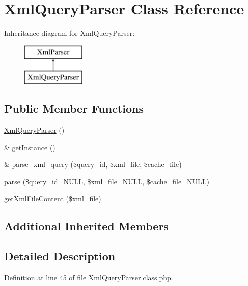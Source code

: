 \hypertarget{classXmlQueryParser}{\section{Xml\+Query\+Parser Class Reference}
\label{classXmlQueryParser}
}
Inheritance diagram for Xml\+Query\+Parser\+:\begin{figure}[H]
\begin{center}
\leavevmode
\includegraphics[height=2.000000cm]{classXmlQueryParser}
\end{center}
\end{figure}
\subsection*{Public Member Functions}
\begin{DoxyCompactItemize}
\item 
\hyperlink{classXmlQueryParser_ac90d36a02cc74ea88d162d6fa0a44e21}{Xml\+Query\+Parser} ()
\item 
\& \hyperlink{classXmlQueryParser_af6558a14a48242f4082d4b05e24b66be}{get\+Instance} ()
\item 
\& \hyperlink{classXmlQueryParser_ada0b24aac541d493f8344a74776664cb}{parse\+\_\+xml\+\_\+query} (\$query\+\_\+id, \$xml\+\_\+file, \$cache\+\_\+file)
\item 
\hyperlink{classXmlQueryParser_a73bf00a88a856f3acb99dba3f554aeb2}{parse} (\$query\+\_\+id=N\+U\+L\+L, \$xml\+\_\+file=N\+U\+L\+L, \$cache\+\_\+file=N\+U\+L\+L)
\item 
\hyperlink{classXmlQueryParser_aed43fc81b117c0d90948cb70cdad6280}{get\+Xml\+File\+Content} (\$xml\+\_\+file)
\end{DoxyCompactItemize}
\subsection*{Additional Inherited Members}


\subsection{Detailed Description}


Definition at line 45 of file Xml\+Query\+Parser.\+class.\+php.



